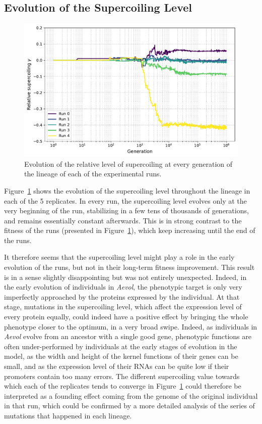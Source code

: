 \subsection{Evolution of the Supercoiling Level}

\begin{figure}
  \includegraphics[width=\textwidth]{aevol/images/supercoiling_all.pdf}
  \caption[Evolution of the supercoiling level of the experimental runs in \emph{Aevol}]{Evolution of the relative level of supercoiling at every generation of the lineage of each of the experimental runs.}
  \label{fig:aevol:sc}
\end{figure}

Figure~\ref{fig:aevol:sc} shows the evolution of the supercoiling level throughout the lineage in each of the 5 replicates.
In every run, the supercoiling level evolves only at the very beginning of the run, stabilizing in a few tens of thousands of generations, and remains essentially constant afterwards.
This is in strong contrast to the fitness of the runs (presented in Figure~\ref{fig:aevol:sc}), which keep increasing until the end of the runs.

It therefore seems that the supercoiling level might play a role in the early evolution of the runs, but not in their long-term fitness improvement.
This result is in a sense slightly disappointing but was not entirely unexpected.
Indeed, in the early evolution of individuals in \emph{Aevol}, the phenotypic target is only very imperfectly approached by the proteins expressed by the individual.
At that stage, mutations in the supercoiling level, which affect the expression level of every protein equally, could indeed have a positive effect by bringing the whole phenotype closer to the optimum, in a very broad swipe.
Indeed, as individuals in \emph{Aevol} evolve from an ancestor with a single good gene, phenotypic functions are often under-performed by individuals at the early stages of evolution in the model, as the width and height of the kernel functions of their genes can be small, and as the expression level of their RNAs can be quite low if their promoters contain too many errors.
The different supercoiling value towards which each of the replicates tends to converge in Figure~\ref{fig:aevol:sc} could therefore be interpreted as a founding effect coming from the genome of the original individual in that run, which could be confirmed by a more detailed analysis of the series of mutations that happened in each lineage.

